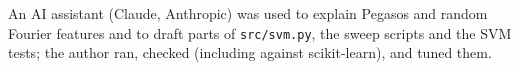 An AI assistant (Claude, Anthropic) was used to explain Pegasos and random
Fourier features and to draft parts of \texttt{src/svm.py}, the sweep scripts
and the SVM tests; the author ran, checked (including against scikit-learn),
and tuned them.